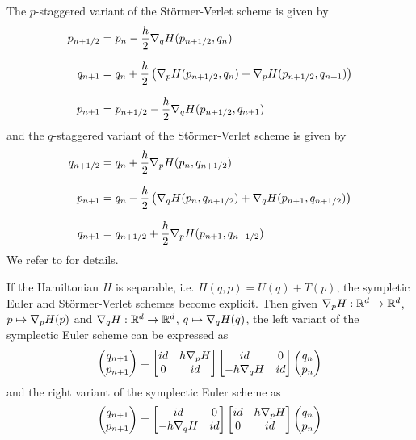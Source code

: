 \documentclass[twoside,a4paper]{article}
\begin{document}
The $p$-staggered variant of the Störmer-Verlet scheme is given by
\begin{align*}
	p_{n+1/2} &= p_n - \frac{h}{2} \grad[q]{H}(p_{n+1/2}, q_n) \\[7pt]
	q_{n+1} &= q_n + \frac{h}{2} \lb \grad[p]{H}(p_{n+1/2}, q_n) + \grad[p]{H}(p_{n+1/2}, q_{n+1}) \rb \\[7pt]
	p_{n+1} &= p_{n+1/2} - \frac{h}{2} \grad[q]{H}(p_{n+1/2}, q_{n+1})
\end{align*}
and the $q$-staggered variant of the Störmer-Verlet scheme is given by
\begin{align*}
	q_{n+1/2} &= q_n + \frac{h}{2} \grad[p]{H}(p_n, q_{n+1/2}) \\[7pt]
	p_{n+1} &= q_n - \frac{h}{2} \lb \grad[q]{H}(p_n, q_{n+1/2}) + \grad[q]{H}(p_{n+1}, q_{n+1/2}) \rb \\[7pt]
	q_{n+1} &= q_{n+1/2} + \frac{h}{2} \grad[p]{H}(p_{n+1}, q_{n+1/2})
\end{align*}
We refer to \citet[p.~189 and p.~190]{hairer2006} for details.

If the Hamiltonian $H$ is separable, i.e. $H(q,p) = U(q) + T(p)$, the sympletic Euler and Störmer-Verlet
schemes become explicit. Then given $\grad[p]{H} : \mathbb{R}^d \to \mathbb{R}^d$, $p \mapsto \grad[p]{H}(p)$ 
and $\grad[q]{H} : \mathbb{R}^d \to \mathbb{R}^d$, $q \mapsto \grad[q]{H}(q)$,
the left variant of the symplectic Euler scheme can be expressed as
\begin{equation*}
	\begin{pmatrix}
		q_{n+1} \\
		p_{n+1}
	\end{pmatrix} =
	\begin{bmatrix}
		id & h \grad[p]{H} \\
		0 & id
	\end{bmatrix} \begin{bmatrix}
		id & 0 \\
		-h \grad[q]{H} & id
	\end{bmatrix}
	\begin{pmatrix}
		q_{n} \\
		p_{n}
	\end{pmatrix} 
\end{equation*}
and the right variant of the symplectic Euler scheme as
\begin{equation*}
	\begin{pmatrix}
		q_{n+1} \\
		p_{n+1}
	\end{pmatrix} =
	\begin{bmatrix}
		id & 0 \\
		-h \grad[q]{H} & id
	\end{bmatrix}
	\begin{bmatrix}
		id & h \grad[p]{H} \\
		0 & id
	\end{bmatrix}
	\begin{pmatrix}
		q_{n} \\
		p_{n}
	\end{pmatrix}
\end{equation*}
\end{document}
